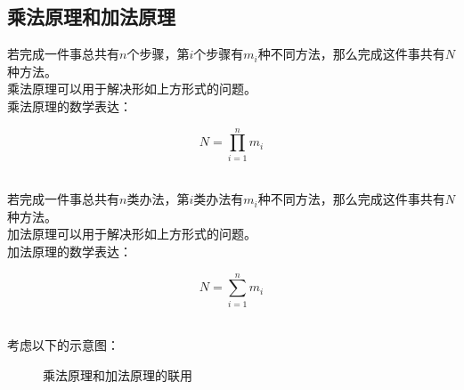 \documentclass[UTF8]{ctexart}
\begin{document}
\subsection{乘法原理和加法原理}
    若完成一件事总共有$n$个步骤，第$i$个步骤有$m_i$种不同方法，那么完成这件事共有$N$种方法。\\[3mm]
    乘法原理可以用于解决形如上方形式的问题。\\[3mm]
    乘法原理的数学表达：
    \begin{large}
        \begin{equation*}
            N=\prod_{i=1}^{n}m_i
        \end{equation*}
    \end{large}\\
    若完成一件事总共有$n$类办法，第$i$类办法有$m_i$种不同方法，那么完成这件事共有$N$种方法。\\[3mm]
    加法原理可以用于解决形如上方形式的问题。\\[3mm]
    加法原理的数学表达：
    \begin{large}
        \begin{equation*}
            N=\sum_{i=1}^{n}m_i
        \end{equation*}
    \end{large}\\
    考虑以下的示意图：\vspace{3pt}
    \begin{figure}[h]
        \begin{center}
            \caption{乘法原理和加法原理的联用}
        \end{center}
    \end{figure}\\
\end{document}
